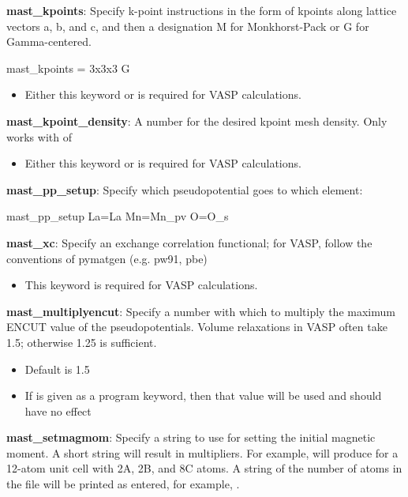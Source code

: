 \documentclass[letterpaper,10pt,english]{sphinxmanual}
\begin{document}
\textbf{mast\_kpoints}: Specify k-point instructions in the form of kpoints along lattice vectors a, b, and c, and then a designation M for Monkhorst-Pack or G for Gamma-centered.

mast\_kpoints = 3x3x3 G
\begin{itemize}
\item {} 
Either this keyword or  is required for VASP calculations.

\end{itemize}

\textbf{mast\_kpoint\_density}: A number for the desired kpoint mesh density. Only works with  of 
\begin{itemize}
\item {} 
Either this keyword or  is required for VASP calculations.

\end{itemize}

\textbf{mast\_pp\_setup}: Specify which pseudopotential goes to which element:

mast\_pp\_setup La=La Mn=Mn\_pv O=O\_s

\textbf{mast\_xc}: Specify an exchange correlation functional; for VASP, follow the conventions of pymatgen (e.g. pw91, pbe)
\begin{itemize}
\item {} 
This keyword is required for VASP calculations.

\end{itemize}

\textbf{mast\_multiplyencut}: Specify a number with which to multiply the maximum ENCUT value of the pseudopotentials. Volume relaxations in VASP often take 1.5; otherwise 1.25 is sufficient.
\begin{itemize}
\item {} 
Default is 1.5

\item {} 
If  is given as a program keyword, then that value will be used and  should have no effect

\end{itemize}

\textbf{mast\_setmagmom}: Specify a string to use for setting the initial magnetic moment. A short string will result in multipliers. For example,  will produce  for a 12-atom unit cell with 2A, 2B, and 8C atoms. A string of the number of atoms in the  file will be printed as entered, for example, .
\end{document}
